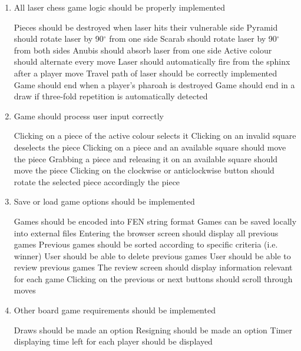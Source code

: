 \documentclass[../main/main.tex]{subfiles}
\begin{document}
\begin{enumerate}
\item All laser chess game logic should be properly implemented
    \begin{enumerate}
    \objitem Pieces should be destroyed when laser hits their vulnerable side
    \objitem Pyramid should rotate laser by 90$^{\circ}$ from one side
    \objitem Scarab should rotate laser by 90$^{\circ}$ from both sides
    \objitem Anubis should absorb laser from one side
    \objitem Active colour should alternate every move
    \objitem Laser should automatically fire from the sphinx after a player move
    \objitem Travel path of laser should be correctly implemented
    \objitem Game should end when a player's pharoah is destroyed
    \objitem Game should end in a draw if three-fold repetition is automatically detected
    \end{enumerate}
\item Game should process user input correctly
    \begin{enumerate}
    \objitem Clicking on a piece of the active colour selects it
    \objitem Clicking on an invalid square deselects the piece
    \objitem Clicking on a piece and an available square should move the piece
    \objitem Grabbing a piece and releasing it on an available square should move the piece
    \objitem Clicking on the clockwise or anticlockwise button should rotate the selected piece accordingly the piece
    \end{enumerate}
\item Save or load game options should be implemented
\label{itm:save-games}
    \begin{enumerate}
    \objitem Games should be encoded into FEN string format
    \objitem Games can be saved locally into external files
    \objitem Entering the browser screen should display all previous games
    \objitem Previous games should be sorted according to specific criteria (i.e. winner)
    \objitem User should be able to delete previous games
    \objitem User should be able to review previous games
    \objitem The review screen should display information relevant for each game
    \objitem Clicking on the previous or next buttons should scroll through moves
    \end{enumerate}
\item Other board game requirements should be implemented
    \begin{enumerate}
    \objitem Draws should be made an option
    \objitem Resigning should be made an option
    \objitem Timer displaying time left for each player should be displayed

\end{enumerate}
\end{enumerate}
\end{document}
